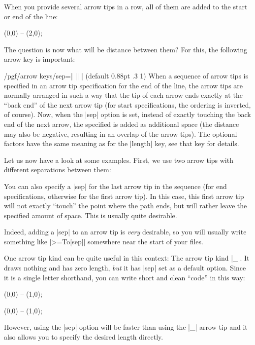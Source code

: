 When you provide several arrow tips in a row, all of them are added to
the start or end of the line:
\begin{codeexample}[]
\tikz \draw [<<<->>>>] (0,0) -- (2,0);
\end{codeexample}
The question is now what will be distance between them? For this, the
following arrow key is important:
\begin{key}{/pgf/arrow keys/sep=| || | (default 0.88pt .3 1)}
  When a sequence of arrow tips is specified in an arrow tip
  specification for the end of the line, the arrow tips are normally
  arranged in such a way that the tip of each arrow ends exactly at
  the ``back end'' of the next arrow tip (for start specifications,
  the ordering is inverted, of course). Now, when the |sep| option is
  set, instead of exactly touching the back end of the next arrow, the
  specified  is added as additional space (the
  distance may also be negative, resulting in an overlap of the arrow
  tips). The optional factors have the same meaning as for the
  |length| key, see that key for details.

  Let us now have a look at some examples. First, we use two arrow
  tips with different separations between them:
\begin{codeexample}[]
\end{codeexample}

  You can also specify a |sep| for the last arrow tip in the sequence
  (for end specifications, otherwise for the first arrow tip). In this
  case, this first arrow tip will not exactly ``touch'' the point
  where the path ends, but will rather leave the specified amount of
  space. This is usually quite desirable.
\begin{codeexample}[]
\end{codeexample}
  Indeed, adding a |sep| to an arrow tip is \emph{very} desirable, so
  you will usually write something like |>={To[sep]}| somewhere near
  the start of your files.

  One arrow tip kind can be quite useful in this context: The arrow
  tip kind |_|. It draws nothing and has zero length, \emph{but} 
  it has |sep| set as a default option. Since it is a single letter
  shorthand, you can write short and clean ``code'' in this way:
\begin{codeexample}[]  
\tikz \draw [->_>] (0,0) -- (1,0);
\end{codeexample}
\begin{codeexample}[]  
\tikz \draw [->__>] (0,0) -- (1,0);
\end{codeexample}
  However, using the |sep| option will be faster than using the |_|
  arrow tip and it also allows you to specify the desired length
  directly. 
\end{key}
